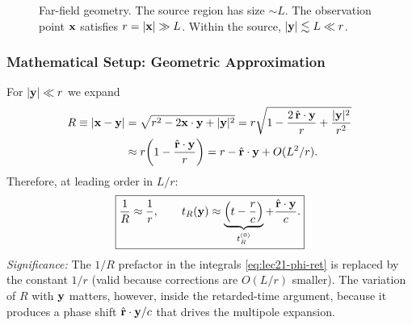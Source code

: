 \begin{figure}[h]
\centering
{}
\caption{Far-field geometry. The source region has size ${\sim}L$. The observation
point $\mathbf{x}$ satisfies $r=|\mathbf{x}|\gg L$. Within the source, $|\mathbf{y}|\lesssim L\ll r$.}
\label{fig:lec21-farfield}
\end{figure}

\subsubsection*{Mathematical Setup: Geometric Approximation}
For $|\mathbf{y}|\ll r$ we expand
\begin{align}\label{eq:lec21-R-expand}
  R \equiv |\mathbf{x}-\mathbf{y}|
  &= \sqrt{r^2 - 2\mathbf{x}\cdot\mathbf{y}+|\mathbf{y}|^2}
   = r\sqrt{1 - \frac{2\,\hat{\mathbf{r}}\cdot\mathbf{y}}{r}+\frac{|\mathbf{y}|^2}{r^2}} \notag\\
  &\approx r\!\left(1 - \frac{\hat{\mathbf{r}}\cdot\mathbf{y}}{r}\right)
   = r - \hat{\mathbf{r}}\cdot\mathbf{y} + O(L^2/r).
\end{align}
Therefore, at leading order in $L/r$:
\begin{equation}\label{eq:lec21-Rleading}
  \boxed{\frac{1}{R} \approx \frac{1}{r},
  \qquad
  t_R(\mathbf{y}) \approx \underbrace{\left(t-\frac{r}{c}\right)}_{t_R^{(0)}}
                         + \frac{\hat{\mathbf{r}}\cdot\mathbf{y}}{c}.}
\end{equation}
\textit{Significance:} The $1/R$ prefactor in the integrals \eqref{eq:lec21-phi-ret}
is replaced by the constant $1/r$ (valid because corrections are $O(L/r)$ smaller). The
variation of $R$ with $\mathbf{y}$ matters, however, inside the retarded-time argument,
because it produces a phase shift $\hat{\mathbf{r}}\cdot\mathbf{y}/c$ that drives the multipole
expansion.

